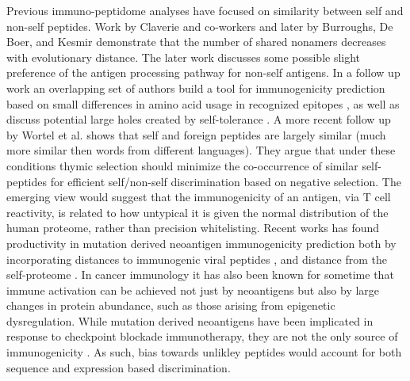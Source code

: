 \documentclass[superscriptaddress,twocolumn,pre]{revtex4}
\newcommand{\<}{\langle}
\renewcommand{\>}{\rangle}
\begin{document}
Previous immuno-peptidome analyses have focused on similarity between self and non-self peptides. Work by Claverie and co-workers \cite{Claverie1988} and later by Burroughs, De Boer, and Kesmir \cite{Burroughs2004} demonstrate that the number of shared nonamers decreases with evolutionary distance. The later work discusses some possible slight preference of the antigen processing pathway for non-self antigens. In a follow up work an overlapping set of authors build a tool for immunogenicity prediction based on small differences in amino acid usage in recognized epitopes \cite{Calis2013}, as well as discuss potential large holes created by self-tolerance \cite{Calis2012a}. A more recent follow up by Wortel et al. \cite{Wortel2018} shows that self and foreign peptides are largely similar (much more similar then words from different languages). They argue that under these conditions thymic selection should minimize the co-occurrence of similar self-peptides for efficient self/non-self discrimination based on negative selection. The emerging view would suggest that the immunogenicity of an antigen, via T cell reactivity, is related to how untypical it is given the normal distribution of the human proteome, rather than precision whitelisting. Recent works has found productivity in mutation derived neoantigen immunogenicity prediction both by incorporating distances to immunogenic viral peptides \cite{Luksza}, and distance from the self-proteome \cite{Vonderheide}. In cancer immunology \cite{Walz2015} it has also been known for sometime that immune activation can be achieved not just by neoantigens but also by large changes in protein abundance, such as those arising from epigenetic dysregulation. While mutation derived neoantigens have been implicated in response to checkpoint blockade immunotherapy, they are not the only source of immunogenicity \cite{XXX}. As such, bias towards unlikley peptides would account for both sequence and expression based discrimination.
\end{document}
